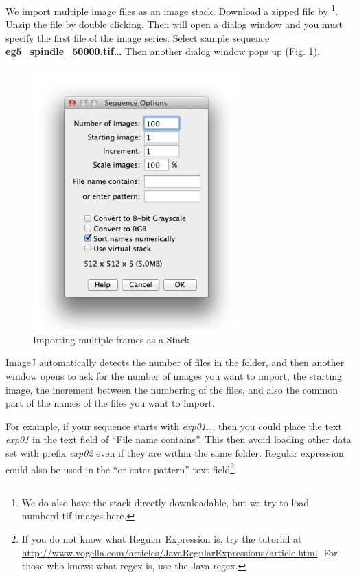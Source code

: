 \begin{indentexercise}{1}
We import multiple image files as an image stack. Download a zipped file by  \footnote{We do also have the stack directly downloadable, but we try to load numberd-tif images here.}. Unzip the file by double clicking. Then
 will open a dialog window and
you must specify the first file of the image series. Select sample sequence
\textbf{eg5\_spindle\_50000.tif\ldots} Then another dialog window pops up (Fig.
\ref{fig:img129}).

\begin{figure}[H]
\begin{center}
\includegraphics[width=0.7\textwidth]{fig/importSeriesDialog.png}
\caption{ Importing multiple frames as a Stack}
\label{fig:img129}
\end{center}
\end{figure}

ImageJ automatically detects the number of files in the folder, and then another
window opens to ask for the number of images you want to import, the starting image, the increment between the numbering of the files, and also
the common part of the names of the files you want to import.

For example, if your sequence starts with \textit{exp01}\ldots, then you could place the text \textit{exp01} in the text field of ``File name contains''. This then avoid loading other data set with prefix \textit{exp02} even if they are within the same folder. Regular expression could also be used in the ``or enter pattern'' text field\footnote{If you do not know what Regular Expression is, try the tutorial at \url{http://www.vogella.com/articles/JavaRegularExpressions/article.html}. For those who knows what regex is, use the Java regex.}. 


\end{indentexercise}
